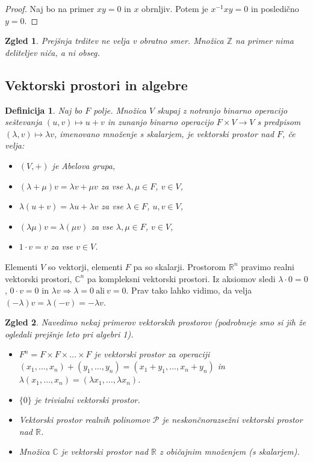 \documentclass[10pt, a4paper]{article}
\newtheorem{defi}{Definicija}[section]
\newenvironment{noticeB}{%
  \tcolorbox[%
  notitle,
  empty,
  enhanced,  %
  breakable,
  coltext=black,
  colback=white, 
  fontupper=\rmfamily,
  noparskip,
  sharp corners,
  boxrule=-1pt,  %
  frame hidden,
  left=7pt,  %
  right=7pt,
  top=5pt,
  bottom=5pt,
  before skip=2.5ex plus 2pt,
  after skip=2.5ex plus 2pt,
  borderline west = {1.5pt}{-0.1pt}{blue!30!black}, %
  overlay unbroken and last={%
    \draw[color=black, line width=1.25pt]
    ($(frame.south west)+(1.pt, -0.1pt)$) -- ++(2em, 0);
  }
  ]}
{\endtcolorbox}
\newenvironment{definicija}{\begin{noticeB}\begin{defi}}{%
    \end{defi}\end{noticeB}}
\newtheorem{zgled}{Zgled}[section]
\newenvironment{noticeC}{%
  \tcolorbox[%
  notitle,
  empty,
  enhanced,  %
  breakable,
  coltext=black, 
  fontupper=\rmfamily,
  noparskip,
  sharp corners,
  boxrule=-1pt,  %
  frame hidden,
  left=7pt,  %
  right=7pt,
  top=5pt,
  bottom=5pt,
  before skip=2.5ex plus 2pt,
  after skip=2.5ex plus 2pt,
  overlay unbroken and last={%
  },
  ]}
{\endtcolorbox}
\newenvironment{dokaz}%
  {\begin{noticeC}\begin{proof}}%
  {\end{proof}\end{noticeC}}
\newcommand{\Z}{\mathbb {Z}}
\newcommand{\R}{\mathbb {R}}
\newcommand{\C}{\mathbb {C}}
\begin{document}
\begin{dokaz}
  Naj bo na primer $xy = 0$ in $x$ obrnljiv.
  Potem je $x^{-1} x y = 0$ in posledično $y = 0$.
\end{dokaz}

\begin{zgled}
  Prejšnja trditev ne velja v obratno smer. Množica $\Z$ na primer nima deliteljev niča, a ni obseg.
\end{zgled}

\subsection{Vektorski prostori in algebre}

\begin{definicija}
  Naj bo $F$ polje. Množica $V$ skupaj z notranjo binarno operacijo seštevanja $(u, v) \mapsto u + v$
  in zunanjo binarno operacijo $F \times V \to V$ s predpisom $(\lambda, v) \mapsto \lambda v$,
  imenovano množenje s skalarjem, je vektorski prostor nad $F$, če velja:
  \begin{itemize}
    \item $(V, +)$ je Abelova grupa,
    \item $(\lambda + \mu)v = \lambda v + \mu v$ za vse $\lambda, \mu \in F$, $v \in V$,
    \item $\lambda (u + v) = \lambda u + \lambda v$ za vse $\lambda \in F$, $u, v \in V$,
    \item $(\lambda \mu)v = \lambda (\mu v)$ za vse $\lambda, \mu \in F$, $v \in V$,
    \item $1 \cdot v = v$ za vse $v \in V$.
  \end{itemize}
\end{definicija}

Elementi $V$ so vektorji, elementi $F$ pa so skalarji.
Prostorom $\R^n$ pravimo realni vektorski prostori, $\C^n$ pa kompleksni vektorski prostori.
Iz aksiomov sledi $\lambda \cdot 0 = 0$, $0 \cdot v = 0$ in $\lambda v \Rightarrow \lambda = 0\ \text{ali}\ v = 0$.
Prav tako lahko vidimo, da velja $(- \lambda)v = \lambda (-v) = - \lambda v$.

\begin{zgled}
  Navedimo nekaj primerov vektorskih prostorov (podrobneje smo si jih že ogledali prejšnje leto pri algebri 1).
  \begin{itemize}
    \item $F^n = {F \times F \times \dots \times F}$ je vektorski prostor za operaciji $(x_1, \dots, x_n) + (y_1, \dots, y_n) = (x_1 + y_1, \dots, x_n + y_n)$
    in $\lambda (x_1, \dots, x_n) = (\lambda x_1, \dots, \lambda x_n)$.
    \item $\{0\}$ je trivialni vektorski prostor.
    \item Vektorski prostor realnih polinomov $\mathcal{P}$ je neskončnorazsežni vektorski prostor nad $\R$.
    \item Množica $\C$ je vektorski prostor nad $\R$ z običajnim množenjem (s skalarjem).
  \end{itemize}
\end{zgled}
\end{document}
